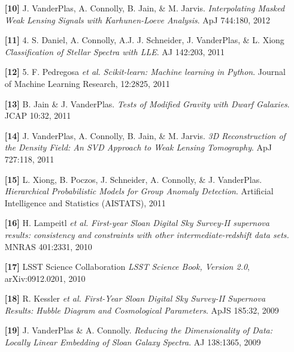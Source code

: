 \documentclass{article} %
\def\bf{\bfseries}
\def\sl{\slshape}
\begin{document}
{\begin{itemize}[leftmargin=0ex, itemsep=0ex, parsep=.5ex, labelindent=-4ex]
    \item[{\bf \textcolor{myblue}{[10]}}]
      J. VanderPlas, A. Connolly, B. Jain, \& M. Jarvis.
      {\it Interpolating Masked Weak Lensing Signals with Karhunen-Loeve
        Analysis}.
      ApJ 744:180, 2012

    \item[{\bf \textcolor{myblue}{[11]}}]
      4. S. Daniel, A. Connolly, A.J. J. Schneider, J. VanderPlas, \& L. Xiong
      {\sl Classification of Stellar Spectra with LLE}.
      AJ 142:203, 2011

    \item[{\bf \textcolor{myblue}{[12]}}]
      5. F. Pedregosa {\sl et al.}
      {\sl Scikit-learn: Machine learning in Python}.
      Journal of Machine Learning Research, 12:2825, 2011

    \item[{\bf \textcolor{myblue}{[13]}}]
      B. Jain \& J. VanderPlas.
      {\sl Tests of Modified Gravity with Dwarf Galaxies}.
      JCAP 10:32, 2011

    \item[{\bf \textcolor{myblue}{[14]}}]
      J. VanderPlas, A. Connolly, B. Jain, \& M. Jarvis.
      {\sl 3D Reconstruction of the Density Field: An SVD Approach
        to Weak Lensing Tomography}.
      ApJ 727:118, 2011

    \item[{\bf \textcolor{myblue}{[15]}}]
      L. Xiong, B. Poczos, J. Schneider, A. Connolly, \& J. VanderPlas.
      {\sl Hierarchical Probabilistic Models for Group Anomaly Detection}.
      Artificial Intelligence and Statistics (AISTATS), 2011

    \item[{\bf \textcolor{myblue}{[16]}}]
      H. Lampeitl {\sl et al.}
      {\sl First-year Sloan Digital Sky Survey-II supernova results: 
      consistency and constraints with other intermediate-redshift data sets.}
      MNRAS 401:2331, 2010

    \item[{\bf \textcolor{myblue}{[17]}}]
      LSST Science Collaboration
      {\sl LSST Science Book, Version 2.0}, arXiv:0912.0201, 2010

    \item[{\bf \textcolor{myblue}{[18]}}]
      R. Kessler {\it et al.}
      {\it First-Year Sloan Digital Sky Survey-II Supernova Results: 
      Hubble Diagram and Cosmological Parameters}.
      ApJS 185:32, 2009

    \item[{\bf \textcolor{myblue}{[19]}}]
      J. VanderPlas \& A. Connolly.
      {\it Reducing the Dimensionality of Data: Locally 
      Linear Embedding of Sloan Galaxy Spectra}.
      AJ 138:1365, 2009


\end{itemize}}
\end{document}
